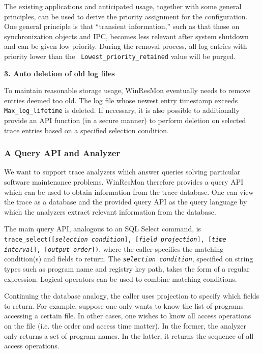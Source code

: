 The existing applications and anticipated usage, together with some general
principles, can be used to derive the priority assignment for the
configuration.  One general principle is that ``transient information,'' such as that
those on synchronization objects and IPC, becomes less relevant after
system shutdown and can be given low priority.  During the removal
process, all log entries with priority lower than the {\tt
Lowest\_priority\_retained} value will be purged.

\noindent
{\bf 3. Auto deletion of old log files}

To maintain reasonable storage usage, WinResMon eventually needs to remove
entries deemed too old.  The log file whose newest entry timestamp exceeds
{\tt Max\_log\_lifetime} is deleted.  If necessary, it is also possible to
additionally provide an API function (in a secure manner) to perform deletion
on selected trace entries based on a specified selection condition.


\subsubsection{A Query API and Analyzer}
\label{sect:queryapi}

We want to support trace analyzers which answer queries solving particular
software maintenance problems.  WinResMon therefore provides a query API which can be 
used to obtain information from the trace database.  
One can view the trace as a database and the provided query API as the query
language by which the analyzers extract relevant information from the
database.

The main query API, analogous to an SQL Select command, is
{\small\tt trace\_select([{\it selection condition}], [{\it field projection}],
[{\it time interval}], [{\it output order}])}, where the caller specifies
the matching condition(s) and fields to return.  The {\small\tt {\it selection
condition}}, specified on string types such as program name and registry key
path, takes the form of a regular expression.  Logical operators can be used
to combine matching conditions.

Continuing the database analogy, the caller uses projection to specify
which fields to return.  For example, suppose one only wants to know the list
of programs accessing a certain file.  In other cases, one wishes to know
all access operations on the file (i.e. the order and access time matter).
In the former, the analyzer only returns a set of program names.  In the
latter, it returns the sequence of all access operations.

